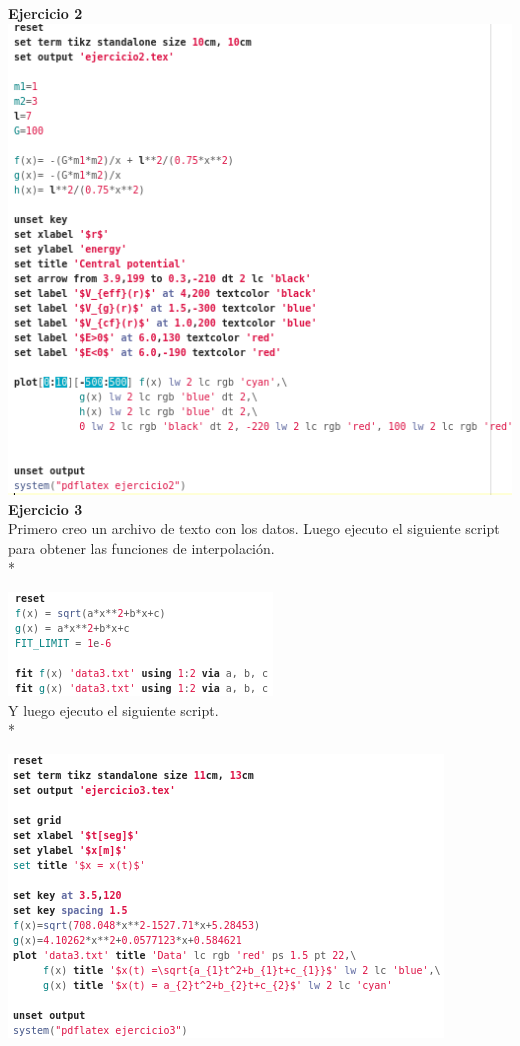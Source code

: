 \documentclass[11.5pt,a4paper]{article}
\begin{document}
\textbf{Ejercicio 2}\\

\includegraphics[scale=0.75]{screen14.png}\\
\newpage
\textbf{Ejercicio 3}\\

Primero creo un archivo de texto con los datos. Luego ejecuto el siguiente script para obtener las funciones de interpolación.\\*

\includegraphics[scale=0.75]{screen15.png}\\

Y luego ejecuto el siguiente script.\\*

\includegraphics[scale=0.75]{screen16.png}
\end{document}
